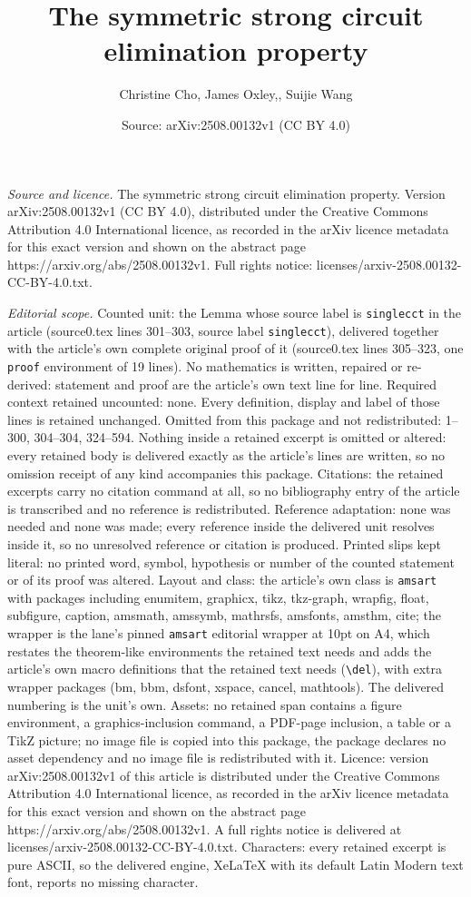 \documentclass[10pt,a4paper]{amsart}
\title[The symmetric strong circuit elimination property]{The symmetric strong circuit elimination property}
\author{Christine Cho, James Oxley,, Suijie Wang}
\date{Source: arXiv:2508.00132v1 (CC BY 4.0)}
\begin{document}
\maketitle

\noindent\emph{Source and licence.} The symmetric strong circuit elimination property. Version arXiv:2508.00132v1 (CC BY 4.0), distributed under the Creative Commons Attribution 4.0 International licence, as recorded in the arXiv licence metadata for this exact version and shown on the abstract page https://arxiv.org/abs/2508.00132v1. Full rights notice: licenses/arxiv-2508.00132-CC-BY-4.0.txt.\par\smallskip

\noindent\textit{Editorial scope.} Counted unit: the Lemma whose source label is \texttt{singlecct} in the article (source0.tex lines 301--303, source label \texttt{singlecct}), delivered together with the article's own complete original proof of it (source0.tex lines 305--323, one \texttt{proof} environment of 19 lines). No mathematics is written, repaired or re-derived: statement and proof are the article's own text line for line. Required context retained uncounted: none. Every definition, display and label of those lines is retained unchanged. Omitted from this package and not redistributed: 1--300, 304--304, 324--594. Nothing inside a retained excerpt is omitted or altered: every retained body is delivered exactly as the article's lines are written, so no omission receipt of any kind accompanies this package. Citations: the retained excerpts carry no citation command at all, so no bibliography entry of the article is transcribed and no reference is redistributed. Reference adaptation: none was needed and none was made; every reference inside the delivered unit resolves inside it, so no unresolved reference or citation is produced. Printed slips kept literal: no printed word, symbol, hypothesis or number of the counted statement or of its proof was altered. Layout and class: the article's own class is \texttt{amsart} with packages including enumitem, graphicx, tikz, tkz-graph, wrapfig, float, subfigure, caption, amsmath, amssymb, mathrsfs, amsfonts, amsthm, cite; the wrapper is the lane's pinned \texttt{amsart} editorial wrapper at 10pt on A4, which restates the theorem-like environments the retained text needs and adds the article's own macro definitions that the retained text needs (\texttt{\textbackslash del}), with extra wrapper packages (bm, bbm, dsfont, xspace, cancel, mathtools). The delivered numbering is the unit's own. Assets: no retained span contains a figure environment, a graphics-inclusion command, a PDF-page inclusion, a table or a TikZ picture; no image file is copied into this package, the package declares no asset dependency and no image file is redistributed with it. Licence: version arXiv:2508.00132v1 of this article is distributed under the Creative Commons Attribution 4.0 International licence, as recorded in the arXiv licence metadata for this exact version and shown on the abstract page https://arxiv.org/abs/2508.00132v1. A full rights notice is delivered at licenses/arxiv-2508.00132-CC-BY-4.0.txt. Characters: every retained excerpt is pure ASCII, so the delivered engine, XeLaTeX with its default Latin Modern text font, reports no missing character.
\end{document}
